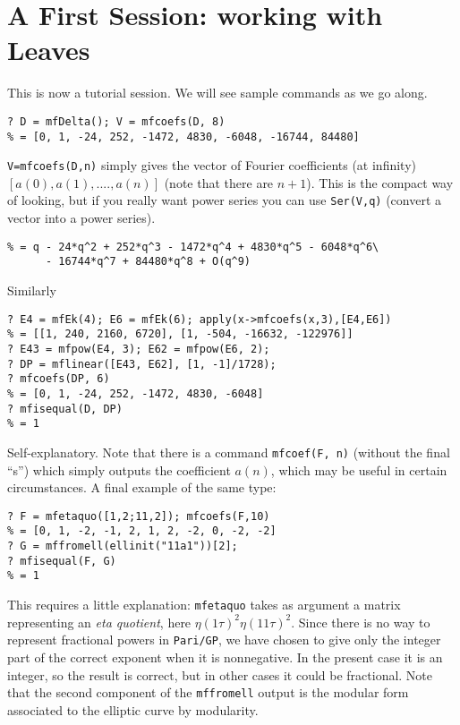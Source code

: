 \documentclass[11pt]{article}
\def\kbd#1{{\tt #1}}
\begin{document}
\section{A First Session: working with Leaves}

This is now a tutorial session. We will see sample commands as we go along.

\begin{verbatim}
? D = mfDelta(); V = mfcoefs(D, 8)
% = [0, 1, -24, 252, -1472, 4830, -6048, -16744, 84480]
\end{verbatim}

\kbd{V=mfcoefs(D,n)} simply gives the vector of Fourier coefficients (at
infinity) $[a(0),a(1),....,a(n)]$ (note that there are $n+1$). This is the
compact way of looking, but if you really want power series you can
use \kbd{Ser(V,q)} (convert a vector into a power series).

\begin{verbatim}
% = q - 24*q^2 + 252*q^3 - 1472*q^4 + 4830*q^5 - 6048*q^6\
      - 16744*q^7 + 84480*q^8 + O(q^9)
\end{verbatim}

Similarly

\begin{verbatim}
? E4 = mfEk(4); E6 = mfEk(6); apply(x->mfcoefs(x,3),[E4,E6])
% = [[1, 240, 2160, 6720], [1, -504, -16632, -122976]]
? E43 = mfpow(E4, 3); E62 = mfpow(E6, 2);
? DP = mflinear([E43, E62], [1, -1]/1728);
? mfcoefs(DP, 6)
% = [0, 1, -24, 252, -1472, 4830, -6048]
? mfisequal(D, DP)
% = 1
\end{verbatim}

Self-explanatory. Note that there is a command \kbd{mfcoef(F, n)} (without
the final ``s'') which simply outputs the coefficient $a(n)$, which may be
useful in certain circumstances. A final example of the same type:

\begin{verbatim}
? F = mfetaquo([1,2;11,2]); mfcoefs(F,10)
% = [0, 1, -2, -1, 2, 1, 2, -2, 0, -2, -2]
? G = mffromell(ellinit("11a1"))[2];
? mfisequal(F, G)
% = 1
\end{verbatim}

This requires a little explanation: \kbd{mfetaquo} takes as argument
a matrix representing an \emph{eta quotient}, here
$\eta(1\tau)^2\eta(11\tau)^2$. Since there is no way to represent fractional
powers in \kbd{Pari/GP}, we have chosen to give only the integer part
of the correct exponent when it is nonnegative. In the present case it
is an integer, so the result is correct, but in other cases it could be
fractional. Note that the second component of the \kbd{mffromell} output is
the modular form associated to the elliptic curve by modularity.
\end{document}
